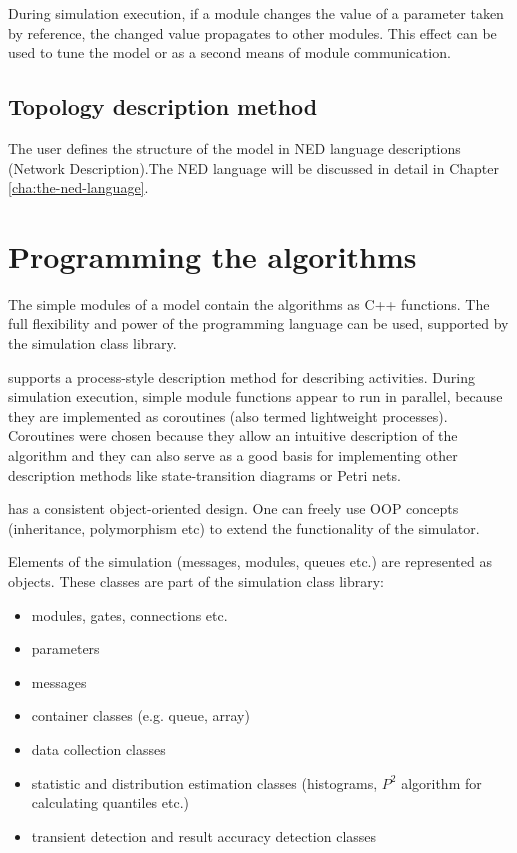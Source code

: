 During simulation execution, if a module changes the value of
a parameter taken by reference, the changed value propagates
to other modules. This effect can be used to tune the model or
as a second means of module communication.


\subsection{Topology description method}
The user defines the structure of the model in NED language descriptions
(Network Description).The NED language will be discussed in detail
in Chapter \ref{cha:the-ned-language}.


\section{Programming the algorithms}

The simple modules of a model contain the algorithms as C++ functions.
The full flexibility and power of the programming language can
be used, supported by the {\opp} simulation class library.


{\opp} supports a process-style description method for describing
activities. During simulation execution, simple module functions
appear to run in parallel, because they are implemented as coroutines
(also termed lightweight processes). Coroutines were chosen because
they allow an intuitive description of the algorithm and they
can also serve as a good basis for implementing other description
methods like state-transition diagrams or Petri nets.

{\opp} has a consistent object-oriented design. One can freely
use OOP concepts (inheritance, polymorphism etc) to extend the
functionality of the simulator.

Elements of the simulation (messages, modules, queues etc.) are
represented as objects. These classes are part of the simulation
class library:
\begin{itemize}
\item{modules, gates, connections etc.}
\item{parameters}
\item{messages}
\item{container classes (e.g. queue, array)}
\item{data collection classes}
\item{statistic and distribution estimation classes (histograms, $P^{2}$
algorithm for calculating quantiles etc.)}
\item{transient detection and result accuracy detection classes}
\end{itemize}

